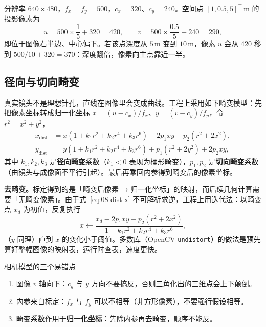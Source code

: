 \begin{example}
分辨率 $640\times480$，$f_x=f_y=500$，$c_x=320$、$c_y=240$。空间点 $[1,0.5,5]^{\top}\,\mathrm{m}$ 的投影像素为
\begin{equation}
  u=500\times\frac{1}{5}+320=420,
  \qquad
  v=500\times\frac{0.5}{5}+240=290,
\end{equation}
即位于图像右半边、中心偏下。若该点深度从 $5\,\mathrm{m}$ 变到 $10\,\mathrm{m}$，像素 $u$ 会从 420 移到 $500/10+320=370$：深度翻倍，像素向主点靠近一半。
\end{example}

\subsection{径向与切向畸变}

真实镜头不是理想针孔，直线在图像里会变成曲线。工程上采用如下畸变模型：先把像素坐标转成归一化坐标 $x=(u-c_x)/f_x$、$y=(v-c_y)/f_y$，令 $r^{2}=x^{2}+y^{2}$，
\begin{align}
  x_{\text{dist}} &= x\left(1+k_1r^{2}+k_2r^{4}+k_3r^{6}\right)
  + 2p_1xy+p_2\left(r^{2}+2x^{2}\right), \label{eq:08-dist-x}\\
  y_{\text{dist}} &= y\left(1+k_1r^{2}+k_2r^{4}+k_3r^{6}\right)
  + p_1\left(r^{2}+2y^{2}\right)+2p_2xy, \label{eq:08-dist-y}
\end{align}
其中 $k_1,k_2,k_3$ 是\textbf{径向畸变}系数（$k_1<0$ 表现为桶形畸变），$p_1,p_2$ 是\textbf{切向畸变}系数（由镜头与成像面不平行引起）。最后再乘回内参得到畸变后的像素坐标。

\textbf{去畸变。}标定得到的是「畸变后像素 → 归一化坐标」的映射，而后续几何计算需要「无畸变像素」。由于式~\eqref{eq:08-dist-x} 不可解析求逆，工程上用迭代法：以畸变点 $x_d$ 为初值，反复执行
\begin{equation}
  x \leftarrow \frac{x_d-2p_1xy-p_2\left(r^{2}+2x^{2}\right)}{1+k_1r^{2}+k_2r^{4}+k_3r^{6}},
  \label{eq:08-undistort}
\end{equation}
（$y$ 同理）直到 $x$ 的变化小于阈值。多数库（OpenCV \texttt{undistort}）的做法是预先算好整幅图像的映射表，运行时查表，速度更快。

\begin{keybox}{相机模型的三个易错点}
\begin{enumerate}
  \item 图像 $v$ 轴向下：$c_y$ 与 $y$ 方向不要搞反，否则三角化出的三维点会上下颠倒。
  \item 内参来自标定：$f_x$ 与 $f_y$ 可以不相等（非方形像素），不要强行假设相等。
  \item 畸变系数作用于\textbf{归一化坐标}：先除内参再去畸变，顺序不能反。
\end{enumerate}
\end{keybox}

